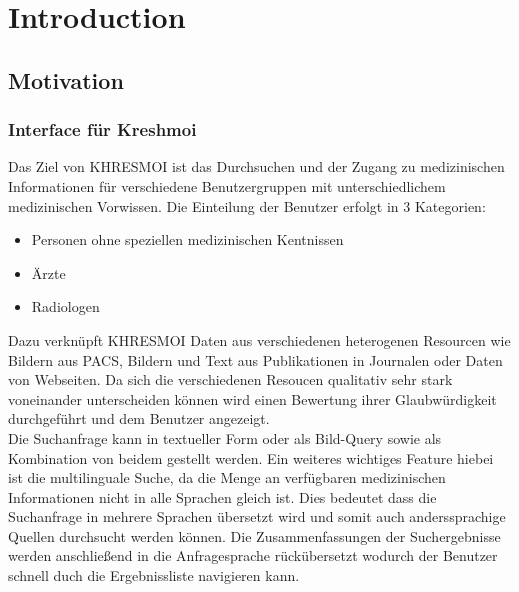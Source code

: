 \section{Introduction}
\label{sec:introduction}

\subsection{Motivation}
\label{sec:Motivation}

\subsubsection{Interface für Kreshmoi}
\label{sec:Interface für Kreshmoi}
Das Ziel von KHRESMOI ist das Durchsuchen und der Zugang zu medizinischen Informationen für verschiedene Benutzergruppen mit unterschiedlichem medizinischen Vorwissen.
Die Einteilung der Benutzer erfolgt in 3 Kategorien:
\begin{itemize}
	\item Personen ohne speziellen medizinischen Kentnissen
	\item Ärzte
	\item Radiologen
\end{itemize}
Dazu verknüpft KHRESMOI Daten aus verschiedenen heterogenen Resourcen wie Bildern aus PACS, Bildern und Text aus Publikationen in Journalen oder Daten von Webseiten.
Da sich die verschiedenen Resoucen qualitativ sehr stark voneinander unterscheiden können wird einen Bewertung ihrer Glaubwürdigkeit durchgeführt und dem Benutzer angezeigt.
\\
Die Suchanfrage kann in textueller Form oder als Bild-Query sowie als Kombination von beidem gestellt werden.
Ein weiteres wichtiges Feature hiebei ist die multilinguale Suche, da die Menge an verfügbaren medizinischen Informationen nicht in alle Sprachen gleich ist.
Dies bedeutet dass die Suchanfrage in mehrere Sprachen übersetzt wird und somit auch anderssprachige Quellen durchsucht werden können.
Die Zusammenfassungen der Suchergebnisse werden anschließend in die Anfragesprache rückübersetzt wodurch der Benutzer schnell duch die Ergebnissliste navigieren kann.
\cite{kres}

